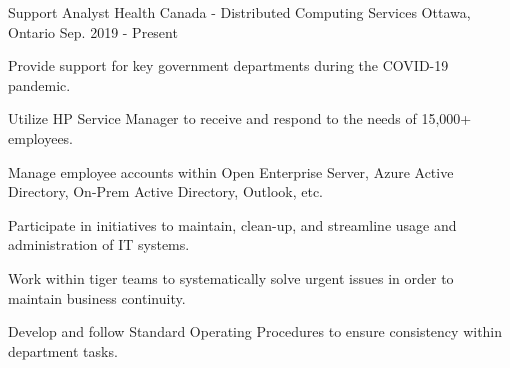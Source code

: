 

\begin{cventries}

  \cventry
    {Support Analyst} %
    {Health Canada - Distributed Computing Services} %
    {Ottawa, Ontario} %
    {Sep. 2019 - Present} %
    {
      \begin{cvitems} %
        \item {Provide support for key government departments during the COVID-19 pandemic.}
        \item {Utilize HP Service Manager to receive and respond to the needs of 15,000+ employees.}
        \item {Manage employee accounts within Open Enterprise Server, Azure Active Directory, On-Prem Active Directory, Outlook, etc.}
	    \item {Participate in initiatives to maintain, clean-up, and streamline usage and administration of IT systems.}
	    \item {Work within tiger teams to systematically solve urgent issues in order to maintain business continuity.}
	    \item {Develop and follow Standard Operating Procedures to ensure consistency within department tasks.}
      \end{cvitems}
    }



\end{cventries}
